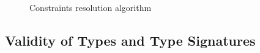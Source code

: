 \begin{figure}
\footnotesize
\centering
\begin{minipage}{.7\linewidth}
\begin{algorithm}[H]

    \SolveCtrs{$(\AEnv;\,\EmptyEnv;\,\CSet)$}{
        \KwRet{$\emptysubst$}
    }
    \BlankLine
\end{algorithm}  
\end{minipage}
\caption{Constraints resolution algorithm \solvectrdflt}\label{fig:ctr-solve}      
\end{figure}


\subsection{Validity of Types and Type Signatures}%
\label{subsec:dec-sub:valid}


